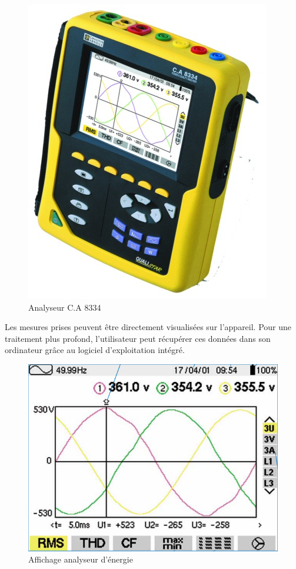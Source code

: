 \begin{figure}[hbtp]
\centering
\includegraphics[scale=1.5]{./Figures/analyseur_energie.jpg}
\caption{Analyseur C.A 8334}
\end{figure}



Les mesures prises peuvent être directement visualisées  sur l'appareil. Pour une traitement plus profond, l'utilisateur peut récupérer ces données dans son ordinateur grâce au logiciel d'exploitation intégré.
\begin{figure}[hbtp]
\centering
\includegraphics[scale=0.5]{./Figures/Ecran_analyseur.png}
\caption{Affichage analyseur d'énergie}
\end{figure}
